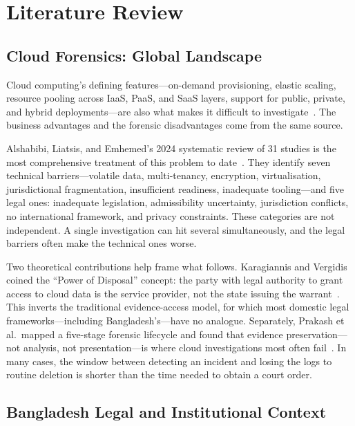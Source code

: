 \documentclass[sigconf,nonacm]{acmart}
\begin{document}
\section{Literature Review}

\subsection{Cloud Forensics: Global Landscape}

Cloud computing's defining features---on-demand provisioning, elastic
scaling, resource pooling across IaaS, PaaS, and SaaS layers, support
for public, private, and hybrid deployments---are also what makes it
difficult to investigate~\cite{akter2023}. The business advantages and
the forensic disadvantages come from the same source.

Alshabibi, Liatsis, and Emhemed's 2024 systematic review of 31 studies
is the most comprehensive treatment of this problem to
date~\cite{alshabibi2024}. They identify seven technical
barriers---volatile data, multi-tenancy, encryption, virtualisation,
jurisdictional fragmentation, insufficient readiness, inadequate
tooling---and five legal ones: inadequate legislation, admissibility
uncertainty, jurisdiction conflicts, no international framework, and
privacy constraints. These categories are not independent. A single
investigation can hit several simultaneously, and the legal barriers
often make the technical ones worse.

Two theoretical contributions help frame what follows. Karagiannis and
Vergidis coined the ``Power of Disposal'' concept: the party with legal
authority to grant access to cloud data is the service provider, not the
state issuing the warrant~\cite{karagiannis2021}. This inverts the
traditional evidence-access model, for which most domestic legal
frameworks---including Bangladesh's---have no analogue. Separately,
Prakash et al.\ mapped a five-stage forensic lifecycle and found that
evidence preservation---not analysis, not presentation---is where cloud
investigations most often fail~\cite{prakash2021}. In many cases, the
window between detecting an incident and losing the logs to routine
deletion is shorter than the time needed to obtain a court order.

\subsection{Bangladesh Legal and Institutional Context}
\end{document}
